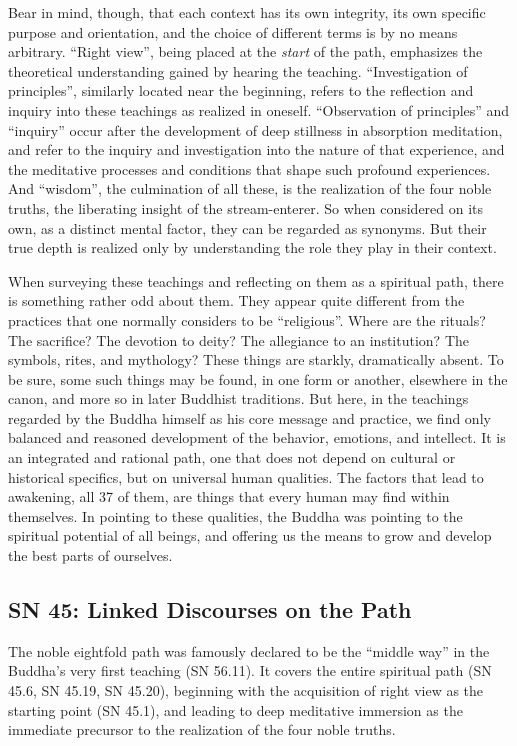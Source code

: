 \documentclass[12pt,openany]{book}%
\begin{document}
Bear in mind, though, that each context has its own integrity, its own specific purpose and orientation, and the choice of different terms is by no means arbitrary. “Right view”, being placed at the \emph{start} of the path, emphasizes the theoretical understanding gained by hearing the teaching. “Investigation of principles”, similarly located near the beginning, refers to the reflection and inquiry into these teachings as realized in oneself. “Observation of principles” and “inquiry” occur after the development of deep stillness in absorption meditation, and refer to the inquiry and investigation into the nature of that experience, and the meditative processes and conditions that shape such profound experiences. And “wisdom”, the culmination of all these, is the realization of the four noble truths, the liberating insight of the stream-enterer. So when considered on its own, as a distinct mental factor, they can be regarded as synonyms. But their true depth is realized only by understanding the role they play in their context.

When surveying these teachings and reflecting on them as a spiritual path, there is something rather odd about them. They appear quite different from the practices that one normally considers to be “religious”. Where are the rituals? The sacrifice? The devotion to deity? The allegiance to an institution? The symbols, rites, and mythology? These things are starkly, dramatically absent. To be sure, some such things may be found, in one form or another, elsewhere in the canon, and more so in later Buddhist traditions. But here, in the teachings regarded by the Buddha himself as his core message and practice, we find only balanced and reasoned development of the behavior, emotions, and intellect. It is an integrated and rational path, one that does not depend on cultural or historical specifics, but on universal human qualities. The factors that lead to awakening, all 37 of them, are things that every human may find within themselves. In pointing to these qualities, the Buddha was pointing to the spiritual potential of all beings, and offering us the means to grow and develop the best parts of ourselves.

\subsection*{SN 45: Linked Discourses on the Path}

The noble eightfold path was famously declared to be the “middle way” in the Buddha’s very first teaching (SN 56.11). It covers the entire spiritual path (SN 45.6, SN 45.19, SN 45.20), beginning with the acquisition of right view as the starting point (SN 45.1), and leading to deep meditative immersion as the immediate precursor to the realization of the four noble truths.
\end{document}
